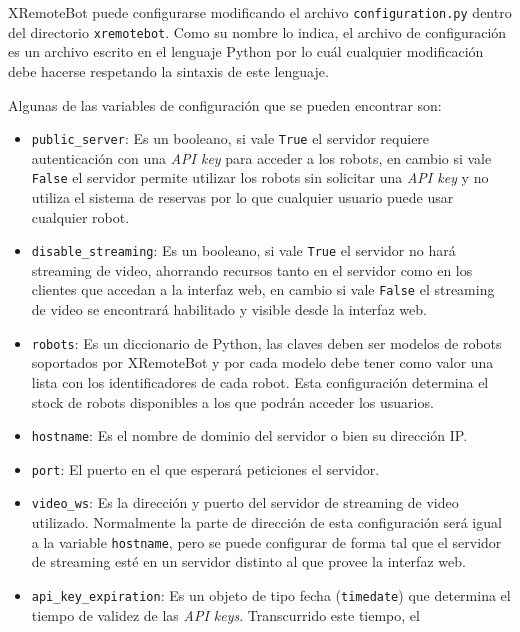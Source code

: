 XRemoteBot puede configurarse modificando el archivo \texttt{configuration.py}
dentro del directorio \texttt{xremotebot}.
Como su nombre lo indica,
el archivo de configuración  es un archivo escrito en el lenguaje
Python por lo cuál cualquier modificación debe hacerse respetando
la sintaxis de este lenguaje.

Algunas de las variables de configuración que se pueden encontrar son:
\begin{itemize}
    \item \texttt{public\_server}: Es un booleano, si vale \texttt{True}
        el servidor requiere autenticación con una \textit{API key} para
        acceder a los robots, en cambio si vale \texttt{False} el servidor
        permite utilizar los robots sin solicitar una \textit{API key} y
        no utiliza el sistema de reservas por lo que cualquier usuario
        puede usar cualquier robot.
    \item \texttt{disable\_streaming}: Es un booleano, si vale \texttt{True}
        el servidor no hará streaming de video, ahorrando recursos tanto
        en el servidor como en los clientes que accedan a la interfaz web,
        en cambio si vale
        \texttt{False} el streaming de video se encontrará habilitado
        y visible desde la interfaz web.
    \item \texttt{robots}: Es un diccionario de Python, las claves
        deben ser modelos de robots soportados por XRemoteBot y por
        cada modelo debe tener como valor una lista con los identificadores
        de cada robot. Esta configuración determina el stock de robots
        disponibles a los que podrán acceder los usuarios.
    \item \texttt{hostname}: Es el nombre de dominio del servidor o bien
        su dirección IP.
    \item \texttt{port}: El puerto en el que esperará peticiones el
        servidor.
    \item \texttt{video\_ws}: Es la dirección y puerto del servidor de
        streaming de video utilizado. Normalmente la parte de
        dirección de esta configuración será igual a la variable
        \texttt{hostname}, pero se puede configurar de forma tal
        que el servidor de streaming esté en un servidor distinto
        al que provee la interfaz web.
    \item \texttt{api\_key\_expiration}: Es un objeto de tipo fecha
        (\texttt{timedate}) que determina el tiempo de validez
        de las \textit{API keys}. Transcurrido este tiempo, el

\end{itemize}
